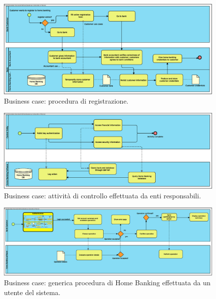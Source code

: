 \documentclass[10pt]{softeng} %
\begin{document}
\begin{figure}[hbt]
	\centering
	\includegraphics[width=\textheight, angle=90]{Images/Home_Banking_registration.eps}
	\caption{Business case: procedura di registrazione.}
	\label{fig:business_case_registration}
\end{figure}

\begin{figure}[hbt]
	\centering
	\includegraphics[width=\textheight, angle=90]{Images/Home_Banking_control_activity.eps}
	\caption{Business case: attivit\`a di controllo effettuata da enti responsabili.}
	\label{fig:business_case_control_activity}
\end{figure}

\begin{figure}[hbt]
	\centering
	\includegraphics[width=\textheight, angle=90]{Images/Home_Banking_generic_action.eps}
	\caption{Business case: generica procedura di Home Banking effettuata da un utente del sistema.}
	\label{fig:business_case_generic_operation}
\end{figure}
\end{document}
